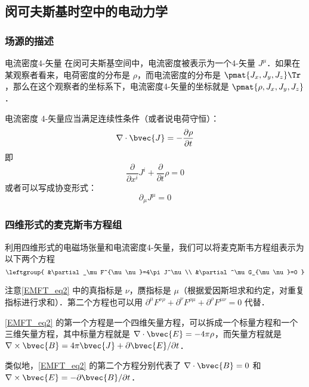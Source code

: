 \subsection{闵可夫斯基时空中的电动力学}

\subsubsection{场源的描述}

\begin{definition}{电流密度4-矢量}
在闵可夫斯基空间中，电流密度被表示为一个4-矢量 $J^\mu$．如果在某观察者看来，电荷密度的分布是 $\rho$，而电流密度的分布是 $\pmat{J_x, J_y, J_z}\Tr$，那么在这个观察者的坐标系下，电流密度4-矢量的坐标就是 $\pmat{\rho, J_x, J_y, J_z}$．
\end{definition}

电流密度 4-矢量应当满足连续性条件（或者说电荷守恒）：
\begin{equation}
\nabla\cdot\bvec{J}=-\frac{\partial\rho}{\partial t}
\end{equation}
即
\begin{equation}
\frac{\partial}{\partial x^i}J^i+\frac{\partial}{\partial t}\rho=0
\end{equation}
或者可以写成协变形式：
\begin{equation}
\partial_\mu J^\mu=0
\end{equation}
\subsubsection{四维形式的麦克斯韦方程组}

利用四维形式的电磁场张量和电流密度4-矢量，我们可以将麦克斯韦方程组表示为以下两个方程
\begin{equation}\label{EMFT_eq2}
\leftgroup{
    &\partial_\mu F^{\mu\nu}=4\pi J^\nu\\
    &\partial^\mu G_{\mu\nu}=0
}
\end{equation}

注意\autoref{EMFT_eq2} 中的真指标是 $\nu$，赝指标是 $\mu$（根据爱因斯坦求和约定，对重复指标进行求和）．第二个方程也可以用 $\partial^\mu F^{\nu\rho}+\partial^\nu F^{\rho\mu}+\partial^\rho F^{\mu\nu}=0$ 代替．

\autoref{EMFT_eq2} 的第一个方程是一个四维矢量方程，可以拆成一个标量方程和一个三维矢量方程，其中标量方程就是 $\nabla\cdot\bvec{E}=-4\pi \rho$，而矢量方程就是 $\nabla\times\bvec{B}=4\pi \bvec{J}+\partial\bvec{E}/\partial t$． 

类似地，\autoref{EMFT_eq2} 的第二个方程分别代表了 $\nabla\cdot\bvec{B}=0$ 和 $\nabla\times\bvec{E}=-\partial\bvec{B}/\partial t$．

